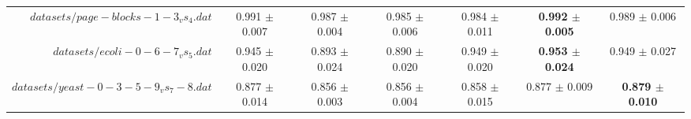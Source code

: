 \begin{table}[!ht]
{\begin{tabular}{r c c c c c c}
$datasets/page-blocks-1-3_vs_4.dat$ & 0.991 $\pm$ 0.007 & 0.987 $\pm$ 0.004 & 0.985 $\pm$ 0.006 & 0.984 $\pm$ 0.011 & \textbf{0.992 $\pm$ 0.005} & 0.989 $\pm$ 0.006 \\
$datasets/ecoli-0-6-7_vs_5.dat$ & 0.945 $\pm$ 0.020 & 0.893 $\pm$ 0.024 & 0.890 $\pm$ 0.020 & 0.949 $\pm$ 0.020 & \textbf{0.953 $\pm$ 0.024} & 0.949 $\pm$ 0.027 \\
$datasets/yeast-0-3-5-9_vs_7-8.dat$ & 0.877 $\pm$ 0.014 & 0.856 $\pm$ 0.003 & 0.856 $\pm$ 0.004 & 0.858 $\pm$ 0.015 & 0.877 $\pm$ 0.009 & \textbf{0.879 $\pm$ 0.010} \\
\end{tabular}}
\end{table}
